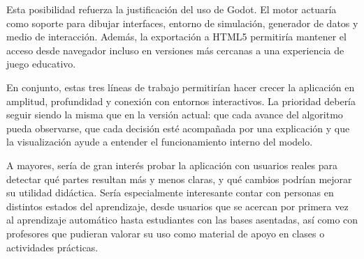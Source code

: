 Esta posibilidad refuerza la justificación del uso de Godot. El motor actuaría como soporte para dibujar interfaces, entorno de simulación, generador de datos y medio de interacción. Además, la exportación a HTML5 permitiría mantener el acceso desde navegador incluso en versiones más cercanas a una experiencia de juego educativo.

En conjunto, estas tres líneas de trabajo permitirían hacer crecer la aplicación en amplitud, profundidad y conexión con entornos interactivos. La prioridad debería seguir siendo la misma que en la versión actual: que cada avance del algoritmo pueda observarse, que cada decisión esté acompañada por una explicación y que la visualización ayude a entender el funcionamiento interno del modelo.

A mayores, sería de gran interés probar la aplicación con usuarios reales para detectar qué partes resultan más y menos claras, y qué cambios podrían mejorar su utilidad didáctica. Sería especialmente interesante contar con personas en distintos estados del aprendizaje, desde usuarios que se acercan por primera vez al aprendizaje automático hasta estudiantes con las bases asentadas, así como con profesores que pudieran valorar su uso como material de apoyo en clases o actividades prácticas.
